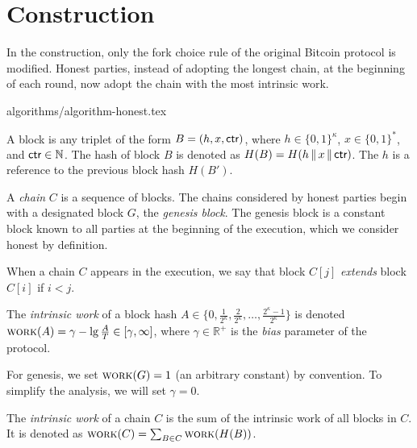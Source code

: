 \section{Construction}\label{sec:construction}
In the \poem construction, only the fork choice rule
of the original Bitcoin protocol is modified.
Honest parties, instead of adopting the longest chain, at the beginning
of each round, now adopt the chain with the most intrinsic work.

{algorithms/algorithm-honest.tex}

A block is any triplet of the
form $B = (h, x, \textsf{ctr})$, where $h \in \{0,1\}^\kappa$, $x \in \{0, 1\}^*$, and $\textsf{ctr} \in \mathbb{N}$.
The hash of block $B$ is denoted as $H(B) = H(h \,\|\, x \,\|\, \textsf{ctr})$.
The $h$ is a reference to the previous block hash $H(B')$.

A \emph{chain} $C$ is a sequence of blocks. The chains considered by honest
parties begin with a designated
block $G$, the \emph{genesis block}. The genesis block is a constant block
known to all parties at the beginning of the execution,
which we consider honest by definition.

When a chain $C$ appears in the execution,
we say that block $C[j]$ \emph{extends} block $C[i]$ if $i < j$.

\begin{definition}\label{def:quantized-block-work}
  The \emph{intrinsic work} of a block hash
  $A \in \{0, \frac{1}{2^\kappa}, \frac{2}{2^\kappa}, \ldots, \frac{2^\kappa - 1}{2^\kappa}\}$
  is denoted $\textsc{work}(A) = \gamma - \lg \frac{A}{T} \in [\gamma, \infty]$,
  where $\gamma \in \mathbb{R}^+$
  is the \emph{bias} parameter of the protocol.
\end{definition}

For genesis, we set $\textsc{work}(G) = 1$ (an arbitrary constant) by convention.
To simplify the analysis, we will set $\gamma = 0$.

\begin{definition}
  The \emph{intrinsic work} of a chain
  $C$ is the sum of the
  intrinsic work of all blocks in $C$.
  It is denoted as $\textsc{work}(C) = \sum_{B \in C}{\textsc{work}(H(B))}$.
\end{definition}

